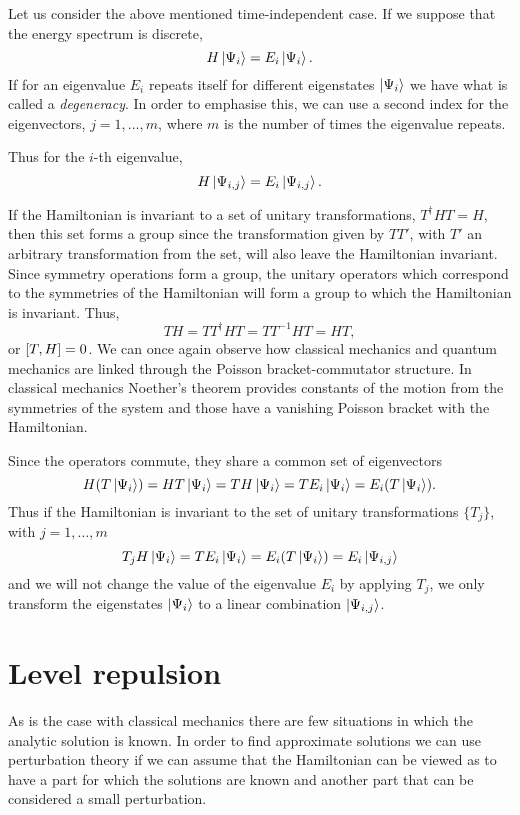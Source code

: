 \documentclass[../thesis.tex]{subfiles}
\theoremstyle{definition}
\begin{document}
Let us consider the above mentioned time-independent case. If we suppose that
the energy spectrum is discrete,
\[
  H \ket{\Psi_i} = E_i \ket{\Psi_i}.
\]
If for an eigenvalue \(E_i\) repeats itself for different eigenstates
\(\ket{\Psi_i}\) we have what is called a \emph{degeneracy}. In order to emphasise
this, we can use a second index for the eigenvectors, \(j=1,\dotsc,m\), where
\(m\) is the number of times the eigenvalue repeats.

Thus for the \(i\)-th eigenvalue,
\[
  H \ket{\Psi_{i,j}} = E_i \ket{\Psi_{i,j}}.
\]

If the Hamiltonian is invariant to a set of unitary transformations,
\(T^\dagger H T = H\), then this set forms a group since the transformation
given by \(T T'\), with \(T'\) an arbitrary transformation from the set,
will also leave the Hamiltonian invariant.
Since symmetry operations form a group, the unitary operators which correspond to the
symmetries of the Hamiltonian will form a group to which the Hamiltonian is invariant.
Thus,
\[
  T H = T T^\dagger H T = T T^{-1} H T = H T,
\]
or \(\comm{T}{H} = 0\). We can once again observe how classical mechanics and
quantum mechanics are linked through the Poisson bracket-commutator structure.
In classical mechanics Noether's theorem provides constants of the motion from
the symmetries of the system and those have a vanishing Poisson bracket with the
Hamiltonian.

Since the operators commute, they share a common set of eigenvectors
\[
  H (T \ket{\Psi_i}) = H T \ket{\Psi_i} = T H \ket{\Psi_i} = T E_i \ket{\Psi_i}
  = E_i (T \ket{\Psi_i}).
\]
Thus if the Hamiltonian is invariant to the set of unitary transformations
\( \{T_j\} \), with \(j=1,\dotsc,m\)
\[
  T_j H \ket{\Psi_i} = T E_i \ket{\Psi_i} = E_i (T \ket{\Psi_i}) = E_i \ket{\Psi_{i,j}}
\]
and we will not change the value of the eigenvalue \(E_i\) by applying \(T_j\),
we only transform the eigenstates \(\ket{\Psi_i}\) to a linear combination
\(\ket{\Psi_{i,j}}\).


\section{Level repulsion}

As is the case with classical mechanics there are few situations in which the
analytic solution is known. In order to find approximate solutions we can use
perturbation theory if we can assume that the Hamiltonian can be viewed as to
have a part for which the solutions are known and another part that can
be considered a small perturbation.
\end{document}
